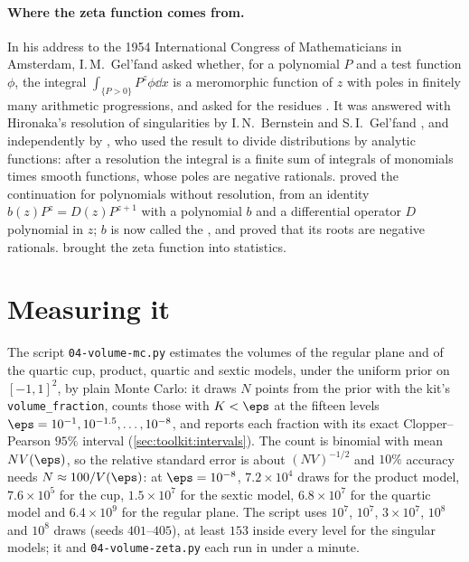 \begin{refsection}
\paragraph{Where the zeta function comes from.} In his address to the 1954 International Congress of Mathematicians in Amsterdam, I.\,M.\ Gel'fand asked whether, for a polynomial $P$ and a test function $\phi$, the integral $\int_{\{P>0\}}P^z\phi\dd x$ is a meromorphic function of $z$ with poles in finitely many arithmetic progressions, and asked for the residues \parencite[\S3, pp.~262--263]{Gelfand1957}. It was answered with Hironaka's resolution of singularities \parencite{Hironaka1964a} by I.\,N.\ Bernstein and S.\,I.\ Gel'fand \parencite{BernsteinGelfand1969}, and independently by \textcite{Atiyah1970}, who used the result to divide distributions by analytic functions: after a resolution the integral is a finite sum of integrals of monomials times smooth functions, whose poles are negative rationals. \Textcite{Bernstein1972} proved the continuation for polynomials without resolution, from an identity $b(z)P^z=D(z)P^{z+1}$ with a polynomial $b$ and a differential operator $D$ polynomial in $z$; $b$ is now called the , and \textcite{Kashiwara1976} proved that its roots are negative rationals. \Textcite{Watanabe1999,Watanabe2001a} brought the zeta function into statistics.

\section{Measuring it}\label{sec:volume:measuring}

The script \texttt{04-volume-mc.py} estimates the volumes of the regular plane and of the quartic cup, product, quartic and sextic models, under the uniform prior on $[-1,1]^2$, by plain Monte Carlo: it draws $N$ points from the prior with the kit's \texttt{volume\_fraction}, counts those with $K<\eps$ at the fifteen levels $\eps=10^{-1},10^{-1.5},\dots,10^{-8}$, and reports each fraction with its exact Clopper--Pearson $95\%$ interval (\cref{sec:toolkit:intervals}). The count is binomial with mean $NV(\eps)$, so the relative standard error is about $(NV)^{-1/2}$ and $10\%$ accuracy needs $N\approx100/V(\eps)$: at $\eps=10^{-8}$, $7.2\times10^4$ draws for the product model, $7.6\times10^5$ for the cup, $1.5\times10^7$ for the sextic model, $6.8\times10^7$ for the quartic model and $6.4\times10^9$ for the regular plane. The script uses $10^7$, $10^7$, $3\times10^7$, $10^8$ and $10^8$ draws (seeds $401$--$405$), at least $153$ inside every level for the singular models; it and \texttt{04-volume-zeta.py} each run in under a minute.


\end{refsection}
